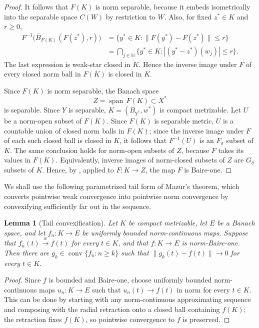 \documentclass[11pt,reqno]{amsart}
\makeatletter
\theoremstyle{plain}
\newtheorem{lemma}[lemma]{Lemma}
\theoremstyle{definition}
\newcounter{problempaper}
\newenvironment{problempaperbody}{%
  \setcounter{subsection}{0}%
  \setcounter{subsubsection}{0}%
  \setcounter{paragraph}{0}%
  \renewcommand{\thesubsection}{\arabic{subsection}}%
  \renewcommand{\thesubsubsection}{\thesubsection.\arabic{subsubsection}}%
  \renewcommand{\theparagraph}{\thesubsubsection.\arabic{paragraph}}%
  \let\problem@outersection\section
  \let\problem@outersubsection\subsection
  \let\problem@outersubsubsection\subsubsection
  \let\problem@outerparagraph\paragraph
  \let\section\problem@papersection
  \let\subsection\problem@papersubsection
  \let\subsubsection\problem@papersubsubsection
}{%
  \let\section\problem@outersection
  \let\subsection\problem@outersubsection
  \let\subsubsection\problem@outersubsubsection
  \let\paragraph\problem@outerparagraph
}
\newcommand{\problem@target}[2]{%
  \hypertarget{problem-\theproblempaper-#1-#2}{}%
}
\newcommand{\problem@paperheading}[3]{%
  \par\bigskip
  \problem@target{#1}{#2}%
  \noindent{\large\bfseries #2.\quad #3\par}%
  \nobreak\smallskip
}
\newcommand{\problem@papersubheading}[3]{%
  \par\medskip
  \problem@target{#1}{#2}%
  \noindent{\normalsize\bfseries #2.\quad #3\par}%
  \nobreak\smallskip
}
\newcommand{\problem@papersubsubheading}[3]{%
  \par\smallskip
  \problem@target{#1}{#2}%
  \noindent{\normalsize\itshape #2.\quad #3.\ }%
}
\def\problem@papersection{%
  \@ifstar{\problem@papersectionstar}{\problem@papersectionnostar}%
}
\def\problem@papersectionstar#1{%
  \par\bigskip\noindent{\large\bfseries #1\par}\nobreak\smallskip
}
\def\problem@papersectionnostar#1{%
  \refstepcounter{subsection}%
  \setcounter{subsubsection}{0}%
  \setcounter{paragraph}{0}%
  \problem@paperheading{section}{\thesubsection}{#1}%
  \problem@writecontentsline{section}{\thesubsection}{#1}%
}
\def\problem@papersubsection{%
  \@ifstar{\problem@papersubsectionstar}{\problem@papersubsectionnostar}%
}
\def\problem@papersubsectionstar#1{%
  \par\medskip\noindent{\normalsize\bfseries #1\par}\nobreak\smallskip
}
\def\problem@papersubsectionnostar#1{%
  \refstepcounter{subsubsection}%
  \setcounter{paragraph}{0}%
  \problem@papersubheading{subsection}{\thesubsubsection}{#1}%
  \problem@writecontentsline{subsection}{\thesubsubsection}{#1}%
}
\def\problem@papersubsubsection{%
  \@ifstar{\problem@papersubsubsectionstar}{\problem@papersubsubsectionnostar}%
}
\def\problem@papersubsubsectionstar#1{%
  \par\smallskip\noindent{\normalsize\itshape #1.\ }%
}
\def\problem@papersubsubsectionnostar#1{%
  \refstepcounter{paragraph}%
  \problem@papersubsubheading{subsubsection}{\theparagraph}{#1}%
  \problem@writecontentsline{subsubsection}{\theparagraph}{#1}%
}
\newcommand{\problem@writecontentsline}[3]{%
  \begingroup
  \protected@write\@auxout{}{%
    \string\problemcontentsentry{\theproblempaper}{#1}{#2}{#3}{\thepage}%
  }%
  \endgroup
}
\newcommand{\problemcontentsentry}[5]{%
  \@ifundefined{problemcontents@#1}{%
    \expandafter\gdef\csname problemcontents@#1\endcsname{}%
  }{}%
  \expandafter\g@addto@macro\csname problemcontents@#1\endcsname{%
    \problemcontentsline{#1}{#2}{#3}{#4}{#5}%
  }%
}
\newcommand{\problemcontentslink}[4]{%
  \hyperlink{problem-#1-#2-#3}{#4}%
}
\newcommand{\problemcontentsline}[5]{%
  \ifstrequal{#2}{section}{%
    \par\noindent
    \problemcontentslink{#1}{#2}{#3}{\makebox[2.5em][l]{#3}#4}%
    \nobreak\dotfill
    \problemcontentslink{#1}{#2}{#3}{#5}\par
  }{%
    \ifstrequal{#2}{subsection}{%
      \par\noindent\hspace*{1.5em}%
      \problemcontentslink{#1}{#2}{#3}{\makebox[3.5em][l]{#3}#4}%
      \nobreak\dotfill
      \problemcontentslink{#1}{#2}{#3}{#5}\par
    }{%
      \par\noindent\hspace*{3em}%
      \problemcontentslink{#1}{#2}{#3}{\makebox[4.5em][l]{#3}#4}%
      \nobreak\dotfill
      \problemcontentslink{#1}{#2}{#3}{#5}\par
    }%
  }%
}
\makeatother
\begin{document}
\begin{problempaperbody}
\begin{proof}
It follows that $F(K)$ is norm separable, because it embeds isometrically into
the separable space $C(W)$ by restriction to $W$. Also, for fixed
$z^*\in K$ and $r\geq0$,
\begin{equation*}
\begin{aligned}
        F^{-1}\bigl(\overline B_{F(K)}(F(z^*),r)\bigr)
        &= \{y^*\in K\colon\|F(y^*)-F(z^*)\|\leq r\} \\
        &=
        \bigcap_{j\in\mathbb N}
        \{y^*\in K\colon |(y^*-z^*)(w_j)|\leq r\}.
\end{aligned}
\end{equation*}
The last expression is weak-star closed in $K$. Hence the inverse image under $F$ of every closed norm ball in $F(K)$ is closed in $K$.

Since $F(K)$ is norm separable, the Banach space
\begin{equation*}
        Z=\overline{\operatorname{span}}\,F(K)\subset X^*
\end{equation*}
is separable. Since $Y$ is separable, $K=(B_{Y^*},w^*)$ is compact metrizable. Let $U$ be a norm-open subset of $F(K)$. Since $F(K)$ is separable metric, $U$ is a countable union of closed norm balls in $F(K)$; since the inverse image under $F$ of each such closed ball is closed in $K$, it follows that $F^{-1}(U)$ is an $F_\sigma$ subset of $K$. The same conclusion holds for norm-open subsets of $Z$, because $F$ takes its values in $F(K)$. Equivalently, inverse images of norm-closed subsets of $Z$ are $G_\delta$ subsets of $K$. Hence, by \cite[Theorem~4]{Stegall1991}, applied to $F\colon K\to Z$, the map $F$ is Baire-one.
\end{proof}

We shall use the following parametrized tail form of Mazur's theorem, which converts pointwise weak convergence into pointwise norm convergence by convexifying sufficiently far out in the sequence.

\begin{lemma}[Tail convexification]
\label{p5:lem:tail-convexification}
Let $K$ be compact metrizable, let $E$ be a Banach space, and let $f_n\colon K\to E$ be uniformly bounded norm-continuous maps. Suppose that $f_n(t)\xrightarrow{w} f(t)$ for every $t\in K$, and that $f\colon K\to E$ is norm-Baire-one. Then there are $g_k\in \operatorname{conv}\{f_n\colon n\geq k\}$ such that $\|g_k(t)-f(t)\|\to0$ for every $t\in K$.
\end{lemma}

\begin{proof}
Since $f$ is bounded and Baire-one, choose uniformly bounded norm-continuous maps $u_n\colon K\to E$ such that $u_n(t)\to f(t)$ in norm for every $t\in K$. This can be done by starting with any norm-continuous approximating sequence and composing with the radial retraction onto a closed ball containing $f(K)$; the retraction fixes $f(K)$, so pointwise convergence to $f$ is preserved.


\end{proof}
\end{problempaperbody}
\end{document}
